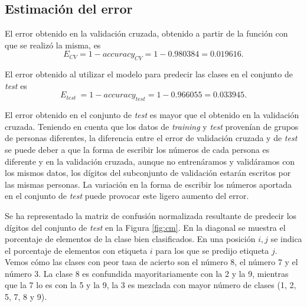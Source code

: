 \documentclass[a4paper, 20pt]{article}
\newcommand{\training}{\textit{training }}
\newcommand{\test}{\textit{test }}
\begin{document}
{%
\subsection{Estimación del error}

El error obtenido en la validación cruzada, obtenido a partir de la función con que se realizó la misma, es \[
E_{CV} = 1 - accuracy_{CV} = 1 - 0.980384 = 0.019616.
\]

El error obtenido al utilizar el modelo para predecir las clases en el conjunto de \test es\[
E_{\test} = 1 - accuracy_{test} = 1 - 0.966055 = 0.033945.
\]

El error obtenido en el conjunto de \test es mayor que el obtenido en la validación cruzada. Teniendo en cuenta que los datos de \training y \test provenían de grupos de personas diferentes, la diferencia entre el error de validación cruzada y de \test se puede deber a que la forma de escribir los números de cada persona es diferente y en la validación cruzada, aunque no entrenáramos y validáramos con los mismos datos, los dígitos del subconjunto de validación estarán escritos por las mismas personas. La variación en la forma de escribir los números aportada en el conjunto de \test puede provocar este ligero aumento del error.

Se ha representado la matriz de confusión normalizada resultante de predecir los dígitos del conjunto de \test en la Figura \ref{fig:cm}. En la diagonal se muestra el porcentaje de elementos de la clase bien clasificados. En una posición $i,j$ se indica el porcentaje de elementos con etiqueta $i$ para los que se predijo etiqueta $j$. Vemos cómo las clases con peor tasa de acierto son el número 8, el número 7 y el número 3. La clase 8 es confundida mayoritariamente con la 2 y la 9, mientras que la 7 lo es con la 5 y la 9, la 3 es mezclada con mayor número de clases (1, 2, 5, 7, 8 y 9).

}
\end{document}
